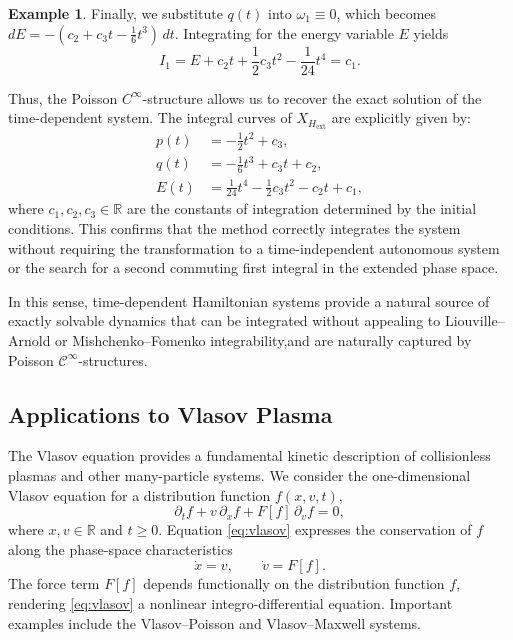 \documentclass{article}
\theoremstyle{remark}
\theoremstyle{definition}
\newtheorem{example}{Example}[section]
\newcommand{\cinf}{$\mathcal{C}^{\infty}$}
\begin{document}
\begin{example}
Finally, we substitute $q(t)$ into $\omega_1 \equiv 0$, which becomes $dE = -(c_2 + c_3 t - \frac{1}{6}t^3) \, dt$. Integrating for the energy variable $E$ yields
\begin{equation}
    I_1 = E + c_2 t + \frac{1}{2}c_3 t^2 - \frac{1}{24}t^4 = c_1.
\end{equation}

Thus, the Poisson $C^\infty$-structure allows us to recover the exact solution of the time-dependent system. The integral curves of $X_{H_{\mathrm{ext}}}$ are explicitly given by:
\begin{equation}
\begin{aligned}
    p(t) &= -\frac{1}{2}t^2 + c_3, \\
    q(t) &= -\frac{1}{6}t^3 + c_3 t + c_2, \\
    E(t) &= \frac{1}{24}t^4 - \frac{1}{2}c_3 t^2 - c_2 t + c_1,
\end{aligned}
\end{equation}
where $c_1, c_2, c_3 \in \mathbb{R}$ are the constants of integration determined by the initial conditions. This confirms that the method correctly integrates the system without requiring the transformation to a time-independent autonomous system or the search for a second commuting first integral in the extended phase space.
\end{example}


In this sense, time-dependent Hamiltonian systems provide a natural
source of exactly solvable dynamics that can be integrated without
appealing to Liouville--Arnold or Mishchenko--Fomenko integrability,\linebreak[3] and
are naturally captured by Poisson \cinf-structures.



\subsection{Applications to Vlasov Plasma}

The Vlasov equation provides a fundamental kinetic description of collisionless
plasmas and other many-particle systems. We consider the one-dimensional Vlasov
equation for a distribution function $f(x,v,t)$,
\begin{equation}\label{eq:vlasov}
\partial_t f + v\,\partial_x f + F[f]\,\partial_v f = 0,
\end{equation}
where $x,v\in\mathbb R$ and $t\ge0$. Equation \eqref{eq:vlasov} expresses the
conservation of $f$ along the phase-space characteristics
\[
\dot x = v,
\qquad
\dot v = F[f].
\]
The force term $F[f]$ depends functionally on the distribution function $f$,
rendering \eqref{eq:vlasov} a nonlinear integro-differential equation. Important
examples include the Vlasov--Poisson and Vlasov--Maxwell systems.
\end{document}
